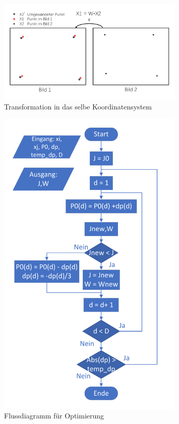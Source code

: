 \begin{figure}[H]
 \centering 
 \includegraphics[keepaspectratio,width=0.8\textwidth]{images/3_Ersteverfahren/Kamera/Transformmatrix.pdf}
 \caption{Transformation in das selbe Koordinatensystem}
 \label{fig:Transformation in eine Koordinate}
\end{figure} 

\begin{figure}[H]
 \centering 
 \includegraphics[keepaspectratio,width=0.8\textwidth]{images/3_Ersteverfahren/Kamera/flussdiagramm_for_parameter.pdf}
 \caption{Flussdiagramm für Optimierung}
 \label{fig:FlussdiagrammforOptimierung}
\end{figure} 



